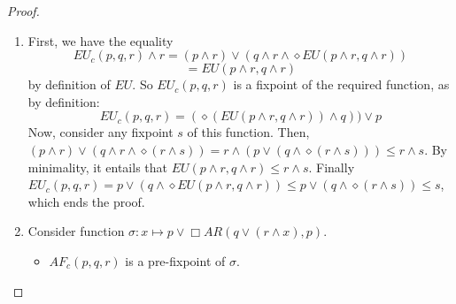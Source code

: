 \documentclass[11pt]{article}
\begin{document}
\begin{proof}
    \begin{enumerate}
        \item First, we have the equality \[EU_c(p,q,r)\wedge r = (p\wedge r)\vee(q\wedge r\wedge\diamond EU(p\wedge r,q\wedge r))\]\[=EU(p\wedge r,q\wedge r)\] by definition of $EU$. So $EU_c(p,q,r)$ is a fixpoint of the required function, as by definition: \[EU_c(p,q,r)=(\diamond(EU(p\wedge r,q\wedge r))\wedge q))\vee p\] Now, consider any fixpoint $s$ of this function. Then, $(p\wedge r)\vee(q\wedge r\wedge\diamond(r\wedge s))= r\wedge(p\vee(q\wedge\diamond(r\wedge s)))\leq r\wedge s$. By minimality, it entails that $EU(p\wedge r,q\wedge r)\leq r\wedge s$. Finally $EU_c(p,q,r)=p\vee(q\wedge\diamond EU(p\wedge r,q\wedge r))\leq p\vee(q\wedge\diamond(r\wedge s))\leq s$, which ends the proof.
        \item Consider function $\sigma :x\mapsto p\vee\Box AR(q\vee(r\wedge x),p)$.
        \begin{itemize}
            \item $AF_c(p,q,r)$ is a pre-fixpoint of $\sigma$.
            

\end{itemize}
\end{enumerate}
\end{proof}
\end{document}
